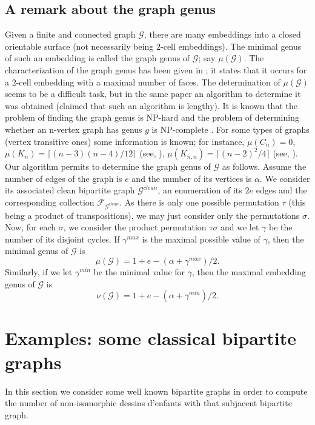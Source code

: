 \documentclass[12pt]{amsart}
\theoremstyle{remark}
\begin{document}
\subsection{A remark about the graph genus}
Given a finite and connected graph ${\mathcal G}$, there are many embeddings into a closed orientable surface (not necessarily being $2$-cell embeddings). The minimal genus of such an embedding is called the graph genus of ${\mathcal G}$; say $\mu({\mathcal G})$. The characterization of the graph genus has been given in \cite{Youngs}; it states that it occurs for a $2$-cell embedding with a maximal number of faces. The determination of $\mu({\mathcal G})$ seems to be a difficult task, but in the same paper an algorithm to determine it was obtained (claimed that such an algorithm is lengthy). It is known that the problem of finding the graph genus is NP-hard and the problem of determining whether an n-vertex graph has genus $g$ is NP-complete \cite{Carsten}. For some types of graphs (vertex transitive ones) some information is known; for instance, $\mu(C_{n})=0$, $\mu(K_{n})=\lceil(n-3)(n-4)/12\rceil$ (see, \cite{R-Y}), $\mu(K_{n,n})=\lceil(n-2)^{2}/4\rceil$ (see, \cite{Ringel}).
Our algorithm permits to determine the graph genus of ${\mathcal G}$ as follows. Assume the number of edges of the graph is $e$ and the number of its vertices is $\alpha$.
We consider its associated clean bipartite graph ${\mathcal G}^{clean}$, an enumeration of its $2e$ edges and the corresponding collection ${\mathcal F}_{{\mathcal G}^{clean}}$. As there is only one possible permutation $\tau$ (this being a product of transpositions), we may just consider only the permutations $\sigma$. Now, for each $\sigma$, we consider the product permutation $\tau\sigma$ and we let $\gamma$ be the number of its disjoint cycles. If $\gamma^{max}$ is the maximal possible value of $\gamma$, then the minimal genus of ${\mathcal G}$ is
$$\mu({\mathcal G})=1+e-(\alpha+\gamma^{max})/2.$$
Similarly, if we let $\gamma^{min}$ be the minimal value for $\gamma$, then the maximal embedding genus of ${\mathcal G}$ is 
$$\nu({\mathcal G})=1+e-(\alpha+\gamma^{min})/2.$$

\section{Examples: some classical bipartite graphs}\label{Sec:ejemplos}
In this section we consider some well known bipartite graphs in order to compute the number of non-isomorphic dessins d'enfants with that subjacent bipartite graph. 
\end{document}
